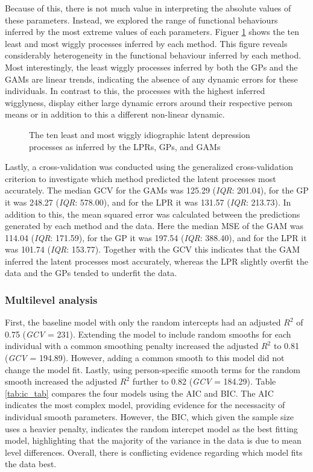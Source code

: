 \documentclass[man, floatsintext]{apa7}
\begin{document}
Because of this, there is not much value in interpreting the absolute values
of these parameters. Instead, we explored the range of functional behaviours
inferred by the most extreme values of each parameters. Figuer
\ref{fig:dem_smooth} shows
the ten least and most wiggly processes inferred by each method. This figure
reveals considerably heterogeneity in the functional behaviour inferred by
each method. Most interestingly, the least wiggly processes inferred by both
the GPs and the GAMs are linear trends, indicating the absence of any
dynamic errors for these individuals. In contrast to this, the processes
with the highest inferred wigglyness, display either large dynamic errors
around their respective person means or in addition to this a different
non-linear dynamic.

\begin{figure}[!ht]
  \caption{The ten least and most wiggly idiographic latent depression
    processes as inferred by the LPRs, GPs, and GAMs}
  \label{fig:dem_smooth}
\end{figure}

Lastly, a cross-validation was conducted using the generalized cross-validation
criterion to investigate which method predicted the latent processes most
accurately. The median GCV for the GAMs was 125.29 (\textit{IQR}: 201.04),
for the GP it was 248.27 (\textit{IQR}: 578.00), and for the LPR it was
131.57 (\textit{IQR}: 213.73). In addition to this, the mean squared error
was calculated between the predictions generated by each method and the data.
Here the median MSE of the GAM was 114.04 (\textit{IQR}: 171.59),
for the GP it was 197.54 (\textit{IQR}: 388.40), and for the LPR it was
101.74 (\textit{IQR}: 153.77). Together with the GCV this indicates that
the GAM inferred the latent processes most accurately, whereas the LPR
slightly overfit the data and the GPs tended to underfit the data.

\subsubsection{Multilevel analysis}

First, the baseline model with only the random intercepts had an
adjusted $R^2$ of 0.75 (\textit{GCV} = 231). Extending the model to include
random smooths for each individual with a common smoothing penalty increased
the adjusted $R^2$ to 0.81 (\textit{GCV} = 194.89). However, adding a common
smooth to this model did not change the model fit.
Lastly, using person-specific smooth terms for the random smooth increased
the adjusted $R^2$ further to 0.82 (\textit{GCV} = 184.29). Table
\ref{tab:ic_tab} compares the four models using the AIC and BIC. The AIC
indicates the most complex model, providing
evidence for the necessacity of individual smooth parameters. However,
the BIC, which given the sample size uses a heavier penalty, indicates
the random intercpet model as the best fitting model, highlighting that
the majority of the variance in the data is due to mean level
differences. Overall, there is conflicting evidence regarding which model
fits the data best.
\end{document}
